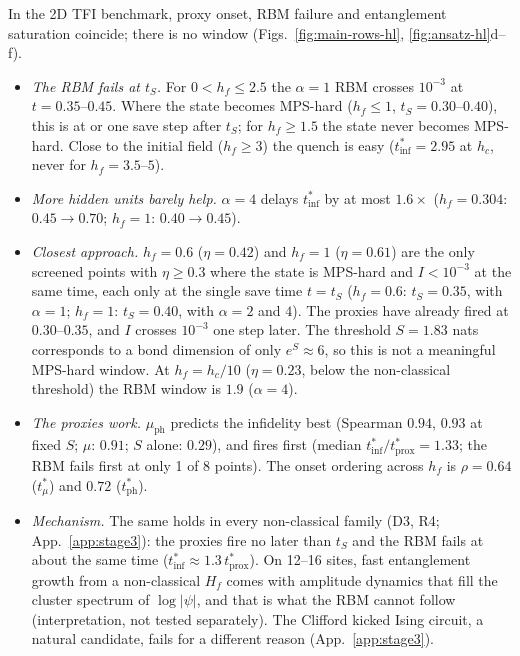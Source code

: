 \documentclass[11pt,a4paper]{article}
\newcommand{\inff}{I}
\newcommand{\tmu}{t^*_\mu}
\newcommand{\tinf}{t^*_{\mathrm{inf}}}
\newcommand{\tph}{t^*_{\mathrm{ph}}}
\newcommand{\tprox}{t^*_{\mathrm{prox}}}
\begin{document}
In the 2D TFI benchmark, proxy onset, RBM failure and entanglement saturation coincide; there is no window
(Figs.~\ref{fig:main-rows-hl}, \ref{fig:ansatz-hl}d--f).
\begin{itemize}
  \item \emph{The RBM fails at $t_S$.} For $0<h_f\le2.5$ the $\alpha=1$ RBM crosses $10^{-3}$ at $t=0.35$--$0.45$.
    Where the state becomes MPS-hard ($h_f\le1$, $t_S=0.30$--$0.40$), this is at or one save step after $t_S$; for
    $h_f\ge1.5$ the state never becomes MPS-hard. Close to the initial field ($h_f\ge3$) the quench is
    easy ($\tinf=2.95$ at $h_c$, never for $h_f=3.5$--$5$).
  \item \emph{More hidden units barely help.} $\alpha=4$ delays $\tinf$ by at most $1.6\times$ ($h_f=0.304$:
    $0.45\to0.70$; $h_f=1$: $0.40\to0.45$).
  \item \emph{Closest approach.} $h_f=0.6$ ($\eta=0.42$) and $h_f=1$ ($\eta=0.61$) are the only screened points with
    $\eta\ge0.3$ where the state is MPS-hard and $\inff<10^{-3}$ at the same time, each only at the single save
    time $t=t_S$ ($h_f=0.6$: $t_S=0.35$, with $\alpha=1$; $h_f=1$: $t_S=0.40$, with $\alpha=2$ and $4$). The proxies
    have already fired at $0.30$--$0.35$, and $\inff$ crosses $10^{-3}$ one step later. The threshold
    $S=1.83$ nats corresponds to a bond dimension of only $e^S\approx6$, so this is not a meaningful MPS-hard window. At $h_f=h_c/10$
    ($\eta=0.23$, below the non-classical threshold) the RBM window is $1.9$ ($\alpha=4$).
  \item \emph{The proxies work.} $\mu_{\mathrm{ph}}$ predicts the infidelity best (Spearman $0.94$, $0.93$ at fixed
    $S$; $\mu$: $0.91$; $S$ alone: $0.29$), and fires first (median $\tinf/\tprox=1.33$; the RBM fails first at only
    1 of 8 points). The onset ordering across $h_f$ is $\rho=0.64$ ($\tmu$) and $0.72$ ($\tph$).
  \item \emph{Mechanism.} The same holds in every non-classical family (D3, R4; App.~\ref{app:stage3}): the proxies
    fire no later than $t_S$ and the RBM fails at about the same time ($\tinf\approx1.3\,\tprox$). On 12--16 sites,
    fast entanglement growth from a non-classical $H_f$ comes with amplitude dynamics that fill the cluster spectrum
    of $\log|\psi|$, and that is what the RBM cannot follow (interpretation, not tested separately). The Clifford
    kicked Ising circuit, a natural candidate, fails for a different reason (App.~\ref{app:stage3}).
\end{itemize}
\end{document}
